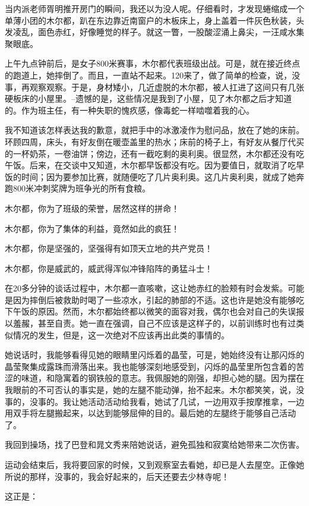 \documentclass[openany]{ctexbook}
\begin{document}
当内派老师胥明推开房门的瞬间，我还以为没人呢。仔细看时，才发现蜷缩成一个单薄小团的木尔都，趴在东边靠近南窗户的木板床上，身上盖着一件灰色秋装，头发凌乱，面色赤红，好像睡觉的样子。就这一瞥，一股酸涩涌上鼻尖，一汪咸水集聚眼底。

上午九点钟前后，是女子800米赛事，木尔都代表班级出战。可是，就在接近终点的跑道上，她摔倒了。而且，一直站不起来。120来了，做了简单的检查，说，没事，再观察观察。于是，身材矮小，几近虚脱的木尔都，被人扛进了这间只有几张硬板床的小屋里。--遗憾的是，这些情况是我到了小屋，见了木尔都之后才知道的。作为班主任，有一种失职的愧疚感，像毒蛇一样啮噬着我的心。

我不知道该怎样表达我的歉意，就把手中的冰激凌作为慰问品，放在了她的床前。环顾四周，床头，有好友倒在暖壶盖里的热水；床前的椅子上，有好友从餐厅代买的一杯奶茶，一卷油饼；傍边，还有一截吃剩的奥利奥。很显然，木尔都还没有吃午饭。后来，在交谈中又知道，木尔都早饭都没有吃。因为要值日，就取消了吃早饭的时间；因为要参加比赛，就随便吃了几片奥利奥。这几片奥利奥，就成了她奔跑800米冲刺奖牌为班争光的所有食粮。

木尔都，你为了班级的荣誉，居然这样的拼命！

木尔都，你为了集体的利益，竟然如此的疯狂！

木尔都，你是坚强的，坚强得有如顶天立地的共产党员！

木尔都，你是威武的，威武得浑似冲锋陷阵的勇猛斗士！

在20多分钟的谈话过程中，木尔都一直咳嗽，这让她赤红的脸颊有时会发紫。可能是因为摔倒后被救助时喝了一些凉水，引起的肺部的不适。这也许是她没有能够吃下午饭的原因。然而，木尔都始终都以微笑的面容对我，偶尔也会对自己的失误报以羞赧，甚至自责。她一直在强调，自己不应该是这样子的，以前训练时也有过类似情况的发生，但是，这一次绝对不应该再出此类的事情的。

她说话时，我能够看得见她的眼睛里闪烁着的晶莹，可是，她始终没有让那闪烁的晶莹聚集成露珠而滑落出来。我也能够深刻地感受到，闪烁的晶莹里所包含着的苦涩的味道，和隐寓着的钢铁般的意志。我佩服她的刚强，却担心她的腿。因为摆在我眼前的不可否认的事实是，她的左腿不能动弹，抬不起来。木尔都笑笑，说，没事的，没事的。我让她活动活动给我看，她试了几试，一边用双手按摩推拿，一边用双手将左腿搬起来，以达到能够屈伸的目的。最后她的左腿终于能够自己活动了。

我回到操场，找了巴登和晁文秀来陪她说话，避免孤独和寂寞给她带来二次伤害。

运动会结束后，我将要回家的时候，又到观察室去看她，却已是人去屋空。正像她所说的那样，没事的，我会好起来的，后天还要去少林寺呢！

这正是：
\end{document}
